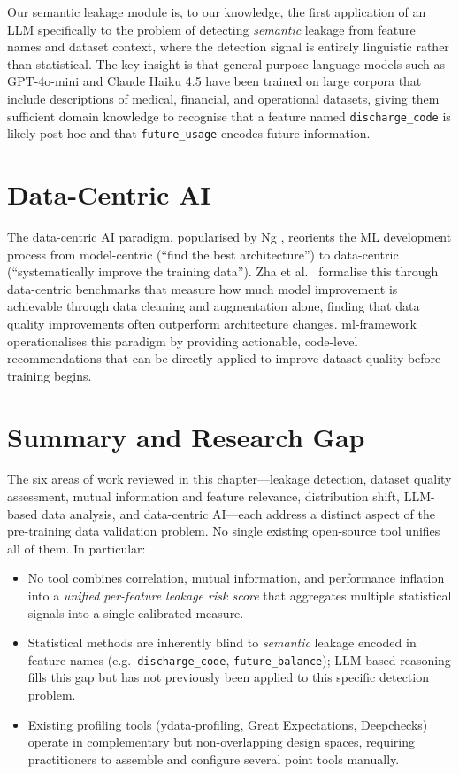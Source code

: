 \documentclass[12pt,a4paper]{report}
\begin{document}
Our semantic leakage module is, to our knowledge, the first application of an LLM
specifically to the problem of detecting \emph{semantic} leakage from feature names and
dataset context, where the detection signal is entirely linguistic rather than statistical.
The key insight is that general-purpose language models such as GPT-4o-mini and Claude
Haiku 4.5 have been trained on large corpora that include
descriptions of medical, financial, and operational datasets, giving them sufficient domain
knowledge to recognise that a feature named \texttt{discharge\_code} is likely post-hoc
and that \texttt{future\_usage} encodes future information.

\section{Data-Centric AI}

The data-centric AI paradigm, popularised by Ng \cite{ng2021}, reorients the ML
development process from model-centric (``find the best architecture'') to data-centric
(``systematically improve the training data'').  Zha et al.\ \cite{zha2023} formalise
this through data-centric benchmarks that measure how much model improvement is achievable
through data cleaning and augmentation alone, finding that data quality improvements often
outperform architecture changes.  ml-framework operationalises this paradigm by providing
actionable, code-level recommendations that can be directly applied to improve dataset
quality before training begins.

\section{Summary and Research Gap}

The six areas of work reviewed in this chapter---leakage detection, dataset quality
assessment, mutual information and feature relevance, distribution shift, LLM-based data
analysis, and data-centric AI---each address a distinct aspect of the pre-training data
validation problem.  No single existing open-source tool unifies all of them.  In
particular:

\begin{itemize}[leftmargin=1.5em]
\item No tool combines correlation, mutual information, and performance inflation into a
  \emph{unified per-feature leakage risk score} that aggregates multiple statistical
  signals into a single calibrated measure.
\item Statistical methods are inherently blind to \emph{semantic} leakage encoded in
  feature names (e.g.\ \texttt{discharge\_code}, \texttt{future\_balance}); LLM-based
  reasoning fills this gap but has not previously been applied to this specific detection
  problem.
\item Existing profiling tools (ydata-profiling, Great Expectations, Deepchecks) operate
  in complementary but non-overlapping design spaces, requiring practitioners to assemble
  and configure several point tools manually.
\end{itemize}
\end{document}
